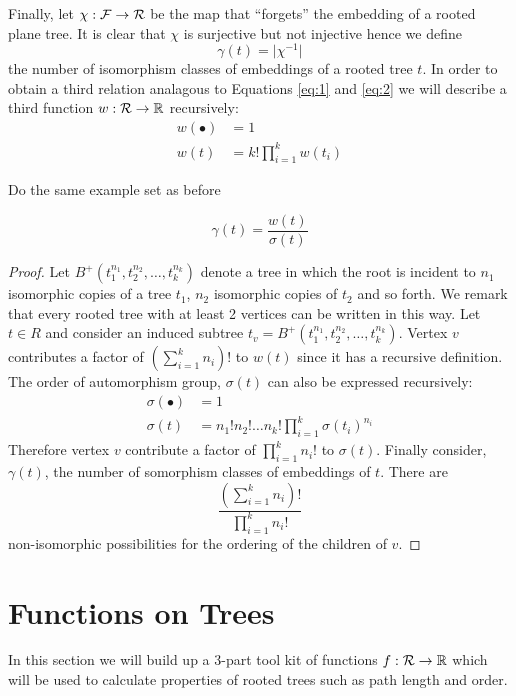Finally, let $\chi: \operatorname{\mathcal{F}} \rightarrow \operatorname{\mathcal{R}}$ be the map that ``forgets'' the embedding of a rooted plane tree.  It is clear that $\chi$ 
is surjective but not injective hence we define
\[
 \gamma(t) = \lvert \chi^{-1} \rvert 
\]
the number of isomorphism classes of embeddings of a rooted tree $t$.  In order to obtain a third relation analagous to Equations 
\ref{eq:1} and \ref{eq:2} we will describe a third function $w: \operatorname{\mathcal{R}} \rightarrow \mathbb{R}$ recursively:
\begin{align}
 w(\bullet) &= 1  \\ 
 w(t)  &= k!\prod_{i=1}^{k}w(t_i) 
\end{align}
\begin{ex}
 Do the same example set as before
\end{ex}

\begin{lem}
 \begin{equation}
  \gamma(t) = \frac{w(t)}{\sigma(t)}
 \end{equation}
\end{lem}
\begin{proof}
 Let $B^{+}(t_1^{n_1},t_2^{n_2},\dots,t_k^{n_k})$ denote a tree in which the root is incident to $n_1$ isomorphic copies 
 of a tree $t_1$, $n_2$ isomorphic copies of $t_2$ and so forth.  We remark that every rooted tree with at least 2 vertices can 
 be written in this way.  Let $t  \in R$ and consider an induced subtree $t_v = B^{+}(t_1^{n_1},t_2^{n_2},\dots,t_k^{n_k})$. 
 Vertex $v$ contributes a factor of $\left( \sum_{i=1}^k n_i \right)! $ to $w(t)$ since it has a recursive definition.  The order of 
 automorphism group, $\sigma(t)$ can also be expressed recursively:
 \begin{align}
  \sigma(\bullet) &= 1 \\
  \sigma(t) &= n_1 ! n_2! \dots n_k ! \prod_{i=1}^k\sigma(t_i)^{n_i} 
 \end{align}
Therefore vertex $v$ contribute a factor of $\prod_{i=1}^k n_i !$ to $\sigma(t)$.  Finally consider, $\gamma(t)$, the number of somorphism classes of embeddings of $t$.  
There are 
\[
 \frac{\left(\sum_{i=1}^k n_i \right)!}{\prod_{i=1}^k n_i!}
\]
non-isomorphic possibilities for the ordering of the children of $v$.
\end{proof}
\section{Functions on Trees}
In this section we will build up a 3-part tool kit of functions $f: \operatorname{\mathcal{R}} \rightarrow \mathbb{R}$ which will be used to calculate 
 properties of rooted trees such as path length and order.  
 
